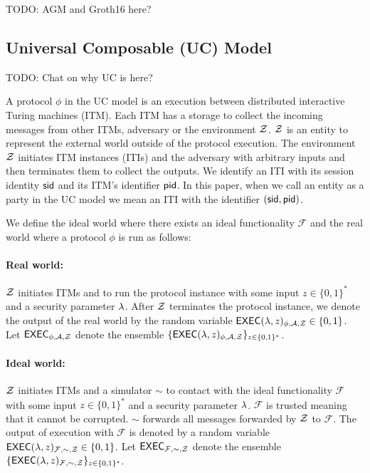 TODO: AGM and Groth16 here?


\subsection{Universal Composable (UC) Model}

TODO: Chat on why UC is here?

A protocol $ \phi $ in the UC model is an execution between distributed interactive Turing machines (ITM). Each ITM has a storage to collect the incoming messages from other ITMs, adversary \adv or the environment $ \mathcal{Z} $. $ \mathcal{Z} $ is an entity to represent the external world outside of the protocol execution.  The environment $ \mathcal{Z} $ initiates ITM instances (ITIs) and the adversary \adv with arbitrary inputs and then terminates them to collect the outputs.
We identify an ITI with its session identity $ \textsf{sid} $ and its ITM's identifier $ \textsf{pid} $. In this paper, when we call an entity as a party in the UC model we mean an ITI with the identifier $ (\textsf{sid}, \textsf{pid}) $.

We define the ideal world where there exists an ideal functionality $ \mathcal{F} $ and the real world where a protocol $ \phi $ is run as follows:

\paragraph{Real world:} $ \mathcal{Z} $ initiates ITMs and \adv to run the protocol instance with some input $ z \in \{0,1\}^* $  and a security parameter $ \lambda $. After $ \mathcal{Z} $ terminates the protocol instance, we denote the output of the real world by the random variable $ \mathsf{EXEC}(\lambda, z)_{\phi, \mathcal{A}, \mathcal{Z}} \in \{0,1\} $. Let $ \mathsf{EXEC}_{\phi, \mathcal{A}, \mathcal{Z}} $ denote the ensemble $ \{\mathsf{EXEC}(\lambda, z)_{\phi, \mathcal{A}, \mathcal{Z}} \}_{z \in \{0,1\}^*} $.

\paragraph{Ideal world:} $ \mathcal{Z} $ initiates ITMs and a simulator $ \sim $ to contact with the ideal functionality $ \mathcal{F} $ with some input $ z \in \{0,1\}^* $  and a security parameter $ \lambda $. $ \mathcal{F} $ is trusted meaning that it cannot be corrupted.
$ \sim $ forwards all messages forwarded by $ \mathcal{Z} $ to $ \mathcal{F} $. The output of execution with $ \mathcal{F} $ is denoted by a random variable $ \mathsf{EXEC}(\lambda, z)_{\mathcal{F},\sim, \mathcal{Z}} \in \{0,1\}$.  Let $ \mathsf{EXEC}_{\mathcal{F},\sim, \mathcal{Z}} $ denote the ensemble $ \{\mathsf{EXEC}(\lambda, z)_{\mathcal{F}, \sim, \mathcal{Z}} \}_{z \in \{0,1\}^*} $.

